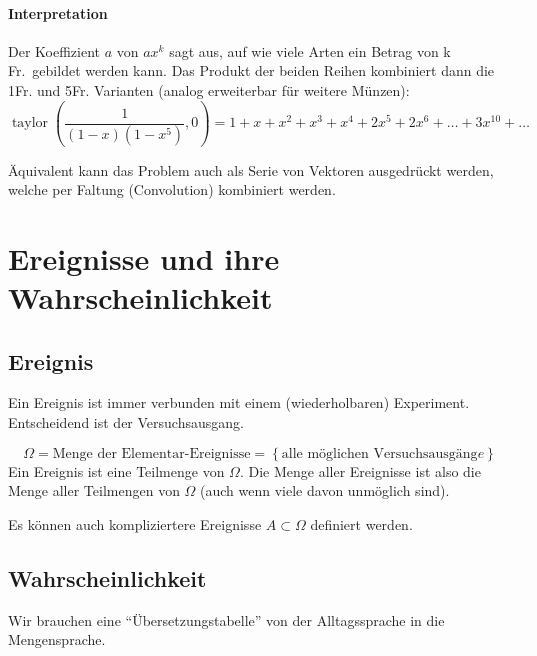 \documentclass[10pt,a4paper]{scrartcl}
\newif\ifincludeExamples
\begin{document}
\paragraph{Interpretation}
Der Koeffizient $a$ von $ax^k$ sagt aus, auf wie viele Arten ein Betrag von k Fr.\ gebildet werden kann. Das Produkt der beiden Reihen kombiniert dann die 1Fr. und 5Fr. Varianten (analog erweiterbar für weitere Münzen):
$$\operatorname{taylor}\left(\frac{1}{(1-x)(1-x^5)}, 0\right) = 1 + x + x^2 + x^3 + x^4 + 2x^5 + 2x^6 + \dots + 3x^{10} + \dots$$

Äquivalent kann das Problem auch als Serie von Vektoren ausgedrückt werden, welche per Faltung (Convolution) kombiniert werden.
\fi

\section{Ereignisse und ihre Wahrscheinlichkeit}
\subsection{Ereignis}
Ein Ereignis ist immer verbunden mit einem (wiederholbaren) Experiment. Entscheidend ist der Versuchsausgang.

$$\Omega = \text{Menge der Elementar-Ereignisse} = \left\{ \text{alle möglichen Versuchsausgäng}e \right\}$$
Ein Ereignis ist eine Teilmenge von $\Omega$. Die Menge aller Ereignisse ist also die Menge aller Teilmengen von $\Omega$ (auch wenn viele davon unmöglich sind).

\ifincludeExamples
Beispiel: 7er-Würfel: $\Omega = \left\{ 1, 2, 3, 4, 5, 6, 7 \right\}$, 
2 6er-Würfel: $\Omega = \left[1, 2, 3, 4, 5, 6\right] \times \left[1, 2, 3, 4 ,5, 6\right]$\\ 
\fi

Es können auch kompliziertere Ereignisse $A \subset \Omega$ definiert werden.
\ifincludeExamples
$$G = \text{``gerade Zahl gewúrfelt''} = \{2, 4, 6\}$$
$$U = \text{``ungerade Zahl gewúrfelt''} = \{1, 3, 5, 7\}$$
$$P = \text{``Primzahl gewúrfelt''} = \{2, 3, 5, 7\}$$
\fi

\subsection{Wahrscheinlichkeit}
Wir brauchen eine ``Übersetzungstabelle'' von der Alltagssprache in die Mengensprache. 
\end{document}
